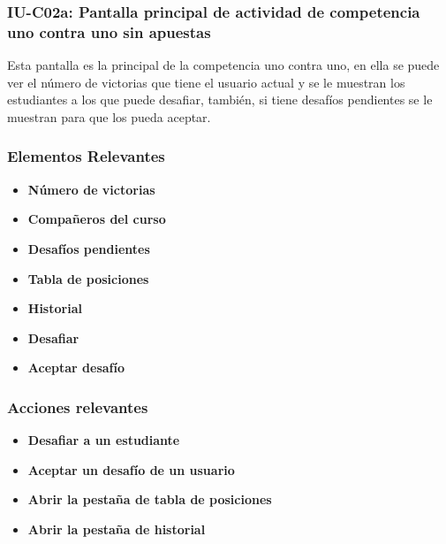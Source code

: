 
\subsubsection{IU-C02a: Pantalla principal de actividad de competencia uno contra uno sin apuestas}

Esta pantalla es la principal de la competencia uno contra uno, en ella se puede ver el número de victorias que tiene el usuario actual y se le muestran los estudiantes a los que puede desafiar, también, si tiene desafíos pendientes se le muestran para que los pueda aceptar.


\subsubsection{Elementos Relevantes}

    \begin{itemize}
    \item {\bf Número de victorias}
    \item {\bf Compañeros del curso}
    \item {\bf Desafíos pendientes}
    \item {\bf Tabla de posiciones}
    \item {\bf Historial}
    \item {\bf Desafiar}
    \item {\bf Aceptar desafío}
    \end{itemize}

\subsubsection{Acciones relevantes}

    \begin{itemize}
    \item {\bf Desafiar a un estudiante}
    \item {\bf Aceptar un desafío de un usuario}
    \item {\bf Abrir la pestaña de tabla de posiciones}
    \item {\bf Abrir la pestaña de historial}
    \end{itemize}

\clearpage
